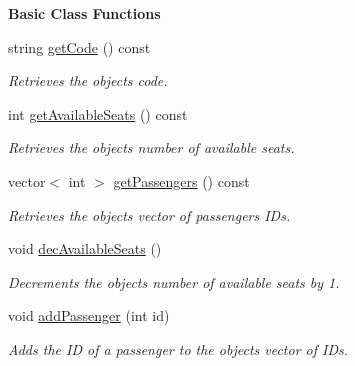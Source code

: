 \begin{Indent}\textbf{ Basic Class Functions}\par
\begin{DoxyCompactItemize}
\item 
string \hyperlink{group___stop_ga4c0a7bb72ca7a054a394d13fc8cd9bde}{get\+Code} () const
\begin{DoxyCompactList}\small\item\em Retrieves the object\textquotesingle{}s code. \end{DoxyCompactList}\item 
int \hyperlink{group___stop_ga41d42147d1210ce72f15e31a8414e0ad}{get\+Available\+Seats} () const
\begin{DoxyCompactList}\small\item\em Retrieves the object\textquotesingle{}s number of available seats. \end{DoxyCompactList}\item 
vector$<$ int $>$ \hyperlink{group___stop_gabd197ec53b1215bed050d879d463e987}{get\+Passengers} () const
\begin{DoxyCompactList}\small\item\em Retrieves the object\textquotesingle{}s vector of passengers I\+Ds. \end{DoxyCompactList}\item 
void \hyperlink{group___stop_ga491669933a1b091fa543591e9fd992aa}{dec\+Available\+Seats} ()
\begin{DoxyCompactList}\small\item\em Decrements the object\textquotesingle{}s number of available seats by 1. \end{DoxyCompactList}\item 
void \hyperlink{group___stop_gac636e3c0c1e2794575bd3db14b5ee363}{add\+Passenger} (int id)
\begin{DoxyCompactList}\small\item\em Adds the ID of a passenger to the object\textquotesingle{}s vector of I\+Ds. \end{DoxyCompactList}\end{DoxyCompactItemize}
\end{Indent}
